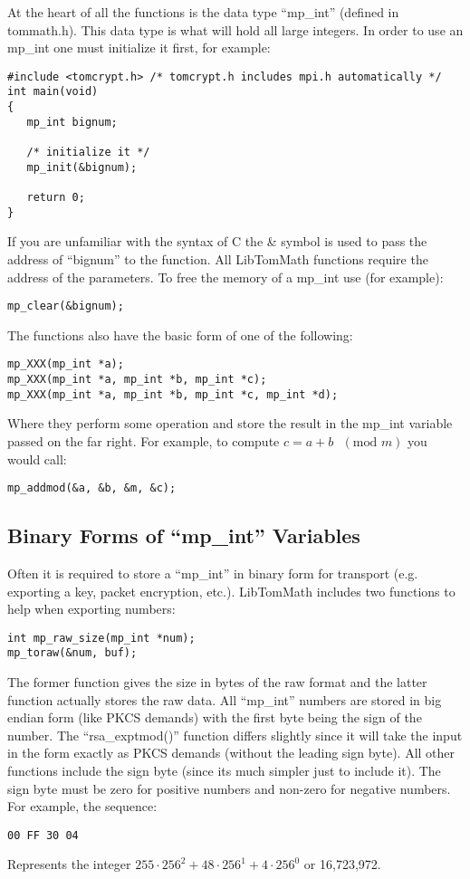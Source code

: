 \documentclass[a4paper]{book}
\begin{document}
At the heart of all the functions is the data type ``mp\_int'' (defined in tommath.h).  This data type is what 
will hold all large integers.  In order to use an mp\_int one must initialize it first, for example:
\begin{verbatim}
#include <tomcrypt.h> /* tomcrypt.h includes mpi.h automatically */
int main(void)
{ 
   mp_int bignum;
   
   /* initialize it */
   mp_init(&bignum);

   return 0;
}
\end{verbatim}
If you are unfamiliar with the syntax of C the \& symbol is used to pass the address of ``bignum'' to the function.  All
LibTomMath functions require the address of the parameters.  To free the memory of a mp\_int use (for example):
\begin{verbatim}
mp_clear(&bignum);
\end{verbatim}

The functions also have the basic form of one of the following:
\begin{verbatim}
mp_XXX(mp_int *a);
mp_XXX(mp_int *a, mp_int *b, mp_int *c);
mp_XXX(mp_int *a, mp_int *b, mp_int *c, mp_int *d);
\end{verbatim}

Where they perform some operation and store the result in the mp\_int variable passed on the far right.  
For example, to compute $c = a + b \mbox{ }(\mbox{mod }m)$ you would call:
\begin{verbatim}
mp_addmod(&a, &b, &m, &c);
\end{verbatim}

\subsection{Binary Forms of ``mp\_int'' Variables}

Often it is required to store a ``mp\_int'' in binary form for transport (e.g. exporting a key, packet 
encryption, etc.).  LibTomMath includes two functions to help when exporting numbers:
\begin{verbatim}
int mp_raw_size(mp_int *num);
mp_toraw(&num, buf);
\end{verbatim}

The former function gives the size in bytes of the raw format and the latter function actually stores the raw data.  All
``mp\_int'' numbers are stored in big endian form (like PKCS demands) with the first byte being the sign of the number.  The
``rsa\_exptmod()'' function differs slightly since it will take the input in the form exactly as PKCS demands (without the
leading sign byte).  All other functions include the sign byte (since its much simpler just to include it).  The sign byte
must be zero for positive numbers and non-zero for negative numbers.  For example,
the sequence:
\begin{verbatim}
00 FF 30 04
\end{verbatim}
Represents the integer $255 \cdot 256^2 + 48 \cdot 256^1 + 4 \cdot 256^0$ or 16,723,972.
\end{document}
